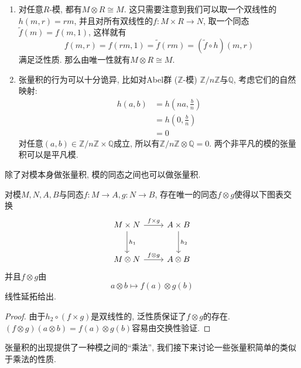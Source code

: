 \begin{eg}\label{eg of tensor product}
    \begin{enumerate}
        \item 对任意$R$-模, 都有$M\otimes R\cong M$.
        这只需要注意到我们可以取一个双线性的$h(m,r)=rm$, 并且对所有双线性的$f:M\times R\to N$, 取一个同态$\widetilde{f}(m)=f(m,1)$,
        这样就有
        \[f(m,r)=f(rm,1)=\widetilde{f}(rm)=(\widetilde{f}\circ h)(m,r)\]
        满足泛性质. 那么由唯一性就有$M\otimes R\cong M$.
        \item 张量积的行为可以十分诡异, 比如对Abel群 ($\mathbb{Z}$-模) $\mathbb{Z}/n\mathbb{Z}$与$\mathbb{Q}$, 考虑它们的自然映射:
        \begin{align*}
            h(a,b)&=h\left(na,\frac{b}{n}\right)\\
            &=h\left(0,\frac{b}{n}\right)\\
            &=0
        \end{align*}
        对任意$(a,b)\in\mathbb{Z}/n\mathbb{Z}\times\mathbb{Q}$成立, 所以有$\mathbb{Z}/n\mathbb{Z}\otimes\mathbb{Q}=0$.
        两个非平凡的模的张量积可以是平凡模.
    \end{enumerate}
\end{eg}

除了对模本身做张量积, 模的同态之间也可以做张量积.
\begin{lem}\label{tensor of map}
    对模$M,N,A,B$与同态$f:M\to A,g:N\to B$, 存在唯一的同态$f\otimes g$使得以下图表交换
    \[\begin{tikzcd}[row sep=large]
        M\times N \arrow[r, "f\times g"] \arrow[d, "h_1"] & A\times B \arrow[d, "h_2"]\\
        M\otimes N \arrow[r, "f\otimes g"] & A\otimes B
    \end{tikzcd}\]
    并且$f\otimes g$由
    \[a\otimes b\mapsto f(a)\otimes g(b)\]
    线性延拓给出.
\end{lem}
\begin{proof}
    由于$h_2\circ(f\times g)$是双线性的, 泛性质保证了$f\otimes g$的存在.
    $(f\otimes g)(a\otimes b)=f(a)\otimes g(b)$容易由交换性验证.
\end{proof}

张量积的出现提供了一种模之间的``乘法'', 我们接下来讨论一些张量积简单的类似于乘法的性质.


